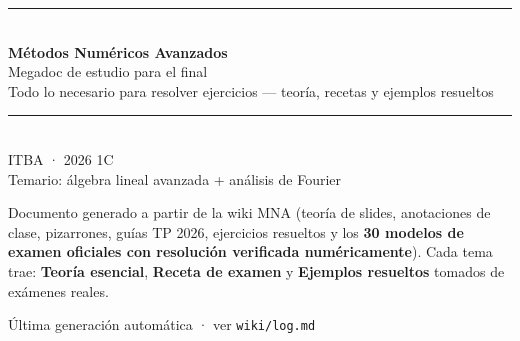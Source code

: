 \documentclass[11pt]{article}
\begin{document}
\begin{titlepage}
\centering
\vspace*{2.5cm}
{\color{cazul}\rule{\linewidth}{1.4pt}}\\[6mm]
{\Huge\bfseries\color{cazul} Métodos Numéricos Avanzados}\\[3mm]
{\LARGE Megadoc de estudio para el final}\\[4mm]
{\large Todo lo necesario para resolver ejercicios — teoría, recetas y ejemplos resueltos}\\[6mm]
{\color{cazul}\rule{\linewidth}{1.4pt}}\\[10mm]
{\large ITBA · 2026 1C}\\[2mm]
{\normalsize Temario: álgebra lineal avanzada + análisis de Fourier}\\[14mm]
\begin{minipage}{0.86\linewidth}\small\color{black!75}
Documento generado a partir de la wiki MNA (teoría de slides, anotaciones de clase, pizarrones,
guías TP 2026, ejercicios resueltos y los \textbf{30 modelos de examen oficiales con resolución
verificada numéricamente}). Cada tema trae: \textbf{Teoría esencial}, \textbf{Receta de examen}
y \textbf{Ejemplos resueltos} tomados de exámenes reales.
\end{minipage}
\vfill
{\footnotesize Última generación automática · ver \texttt{wiki/log.md}}
\end{titlepage}

\tableofcontents
\newpage








\end{document}
